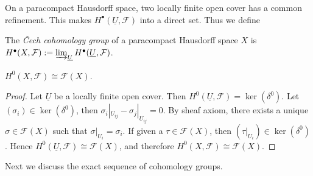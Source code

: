 On a paracompact Hausdorff space, two locally finite open cover has a common refinement.
This makes $H^\bullet(\underline{U},\mathcal{F})$ into a direct set.
Thus we define
\begin{defn}
    The \emph{\v{C}ech cohomology group} of a paracompact Hausdorff space $X$ is $H^\bullet(X,\mathcal{F}):=\varinjlim_{\underline{U}}H^\bullet(\underline{U},\mathcal{F})$.
\end{defn}

\begin{prop}
    $H^0(X,\mathcal{F})\cong\mathcal{F}(X)$.
\end{prop}
\begin{proof}
    Let $\underline{U}$ be a locally finite open cover.
    Then $H^0(\underline{U},\mathcal{F})=\ker(\delta^0)$.
    Let $(\sigma_i)\in\ker(\delta^0)$, then $\sigma_i|_{U_{ij}}-\sigma_j|_{U_{ij}}=0$.
    By sheaf axiom, there exists a unique $\sigma\in\mathcal{F}(X)$ such that $\sigma|_{U_i}=\sigma_i$.
    If given a $\tau\in\mathcal{F}(X)$, then $(\tau|_{U_i})\in\ker(\delta^0)$.
    Hence $H^0(\underline{U},\mathcal{F})\cong\mathcal{F}(X)$, and therefore $H^0(X,\mathcal{F})\cong\mathcal{F}(X)$.
\end{proof}

Next we discuss the exact sequence of cohomology groups.

